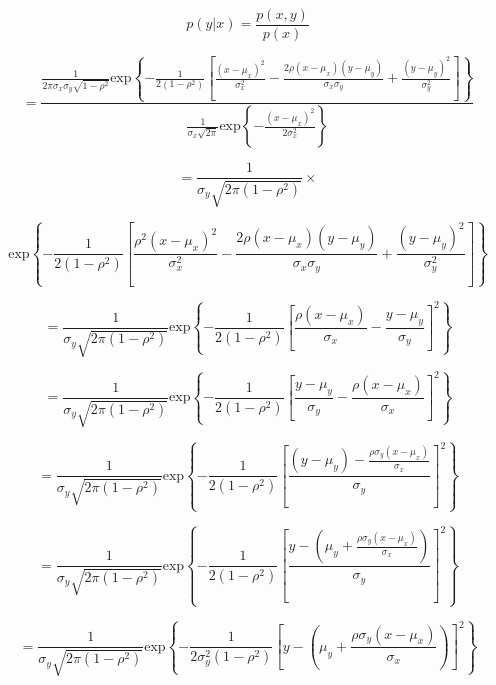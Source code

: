 \documentclass[fleqn]{article}
\begin{document}
\begin{enumerate}
		\begin{equation*}		
			p(y|x) = \frac{p(x,y)}{p(x)}
		\end{equation*}
		
		\begin{equation*}
			 = \frac{\frac{1}{2\pi\sigma_x\sigma_y\sqrt{1-\rho^2}}\text{exp}\left\{-\frac{1}{2(1-\rho^2)}\left[\frac{(x-\mu_x)^2}{\sigma_x^2}-\frac{2\rho(x-\mu_x)(y-\mu_y)}{\sigma_x\sigma_y}+\frac{(y-\mu_y)^2}{\sigma_y^2}\right]\right\}}{\frac{1}{\sigma_x\sqrt{2\pi}}\text{exp}\left\{-\frac{(x-\mu_x)^2}{2\sigma_x^2}\right\}}
		\end{equation*}
		
		\begin{equation*}
			= \frac{1}{\sigma_y\sqrt{2\pi(1-\rho^2)}} \times
		\end{equation*}
	
		\begin{equation*}		
			\text{exp}\left\{-\frac{1}{2(1-\rho^2)}\left[\frac{\rho^2(x-\mu_x)^2}{\sigma_x^2}-\frac{2\rho(x-\mu_x)(y-\mu_y)}{\sigma_x\sigma_y}+\frac{(y-\mu_y)^2}{\sigma_y^2}\right]\right\}
		\end{equation*}
	
		\begin{equation*}		
			= \frac{1}{\sigma_y\sqrt{2\pi(1-\rho^2)}}\text{exp}\left\{-\frac{1}{2(1-\rho^2)}\left[\frac{\rho(x-\mu_x)}{\sigma_x} - \frac{y - \mu_y}{\sigma_y}\right]^2\right\}
		\end{equation*}
		
		\begin{equation*}		
			= \frac{1}{\sigma_y\sqrt{2\pi(1-\rho^2)}}\text{exp}\left\{-\frac{1}{2(1-\rho^2)}\left[\frac{y - \mu_y}{\sigma_y} - \frac{\rho(x-\mu_x)}{\sigma_x}\right]^2\right\}
		\end{equation*}
		
		\begin{equation*}		
			= \frac{1}{\sigma_y\sqrt{2\pi(1-\rho^2)}}\text{exp}\left\{-\frac{1}{2(1-\rho^2)}\left[\frac{(y - \mu_y) - \frac{\rho\sigma_y(x-\mu_x)}{\sigma_x}}{\sigma_y}\right]^2\right\}
		\end{equation*}
		
		\begin{equation*}		
			= \frac{1}{\sigma_y\sqrt{2\pi(1-\rho^2)}}\text{exp}\left\{-\frac{1}{2(1-\rho^2)}\left[\frac{y - \left(\mu_y + \frac{\rho\sigma_y(x-\mu_x)}{\sigma_x}\right)}{\sigma_y}\right]^2\right\}
		\end{equation*}
		
		\begin{equation*}		
			= \frac{1}{\sigma_y\sqrt{2\pi(1-\rho^2)}}\text{exp}\left\{-\frac{1}{2\sigma_y^2(1-\rho^2)}\left[y - \left(\mu_y + \frac{\rho\sigma_y(x-\mu_x)}{\sigma_x}\right)\right]^2\right\}
		\end{equation*}
		

\end{enumerate}
\end{document}
